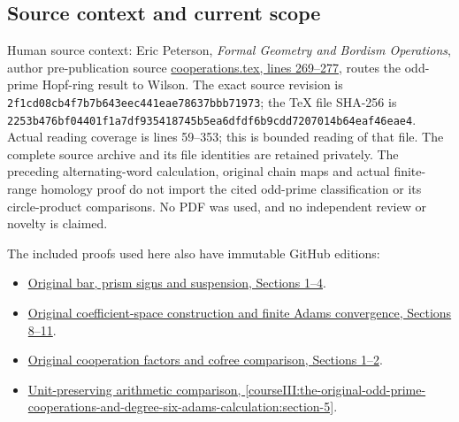 \subsection{Source context and current scope}
\label{courseIII:the-original-odd-prime-cooperations-and-degree-six-adams-calculation:odd-source-context}

\label{courseIII:the-original-odd-prime-cooperations-and-degree-six-adams-calculation:section-8}

Human source context: Eric Peterson, \emph{Formal Geometry and Bordism Operations}, author pre-publication source \href{https://github.com/ecpeterson/FormalGeomNotes/blob/2f1cd08cb4f7b7b643eec441eae78637bbb71973/cooperations.tex\#L269-L277}{cooperations.tex, lines 269--277}, routes the odd-prime Hopf-ring result to Wilson. The exact source revision is \texttt{2f1cd08cb4f7b7b643eec441eae78637bbb71973}; the TeX file SHA-256 is \texttt{2253b476bf04401f1a7df935418745b5ea6dfdf6b9cdd7207014b64eaf46eae4}. Actual reading coverage is lines 59--353; this is bounded reading of that file. The complete source archive and its file identities are retained privately. The preceding alternating-word calculation, original chain maps and actual finite-range homology proof do not import the cited odd-prime classification or its circle-product comparisons. No PDF was used, and no independent review or novelty is claimed.

The included proofs used here also have immutable GitHub editions:

\begin{itemize}

\item
  \href{https://github.com/KokunoYumeto/open-math-courses/blob/bcfc7bad136daa4c6a451b46ea8f1cfb651939a6/docs/courses/CG-S6/src/the-actual-mod-two-cooperation-comparison-through-degree-eight.md\#actual-eight-bar-comparison}{Original bar, prism signs and suspension, Sections 1--4}.
\item
  \href{https://github.com/KokunoYumeto/open-math-courses/blob/bcfc7bad136daa4c6a451b46ea8f1cfb651939a6/docs/courses/CG-S6/src/the-adams-tower-and-exact-inverse-limits.md\#adams-original-cocycles}{Original coefficient-space construction and finite Adams convergence, Sections 8--11}.
\item
  \href{https://github.com/KokunoYumeto/open-math-courses/blob/bcfc7bad136daa4c6a451b46ea8f1cfb651939a6/docs/courses/CG-S6/src/the-actual-mod-two-adams-resolution-and-cooperation-maps.md\#cooperation-original-factors}{Original cooperation factors and cofree comparison, Sections 1--2}.
\item
  \href{https://github.com/KokunoYumeto/open-math-courses/blob/bcfc7bad136daa4c6a451b46ea8f1cfb651939a6/docs/courses/CG-S6/src/the-original-adams-tower-and-arithmetic-completion.md\#arithmetic-adams-equivalence}{Unit-preserving arithmetic comparison, \cref{courseIII:the-original-odd-prime-cooperations-and-degree-six-adams-calculation:section-5}}.
\end{itemize}

